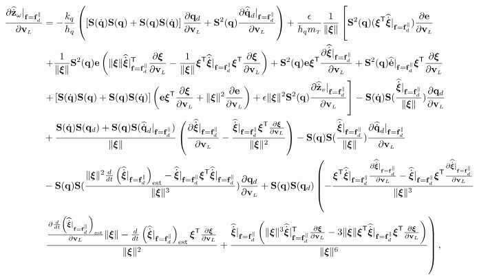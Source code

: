 \documentclass[journal,onecolumn]{IEEEtran}
\begin{document}
    \begin{align}
        \frac{\partial\zwdothat|_{\f=\fd^{\|}}}{\partial\vL}&=-\frac{k_q}{h_q}\left(\LSB\Skew{\dirdot}\Skew{\dir}+\Skew{\dir}\Skew{\dirdot}\RSB\frac{\partial\dird}{\partial\vL}
        +\Skew[2]{\dir}\frac{\partial\qddothat|_{\f=\fd^{\|}}}{\partial\vL}\right)+\frac{\epsilon}{h_{q}\mT}\frac{1}{\|\Xiq\|}\left[\vphantom{\frac{\partial\zvdothat|_{\f=\fd^{\|}}}{\partial\vL}}\Skew[2]{\dir}(\Xiq[T]\widehat{\dot{\Xiq}}|_{\f=\fd^{\|}})\frac{\partial{\bf e}}{\partial\vL}\right. \nonumber\\
        &\left.+\frac{1}{\|\Xiq\|}\Skew[2]{\dir}{\bf e}\LP\|\Xiq\|\widehat{\dot{\Xiq}}|_{\f=\fd^{\|}}\trs\frac{\partial\Xiq}{\partial\vL}-\frac{1}{\|\Xiq\|}\Xiq[T]\widehat{\dot{\Xiq}}|_{\f=\fd^{\|}}\Xiq[T]\frac{\partial\Xiq}{\partial\vL}\RP
        + \Skew[2]{\dir}{\bf e}\Xiq[T]\frac{\partial\widehat{\dot{\Xiq}}|_{\f=\fd^{\|}}}{\partial\vL}+\Skew[2]{\dir}\widehat{\dot{\bf e}}|_{\f=\fd^{\|}}\Xiq[T]\frac{\partial\Xiq}{\partial\vL}\right.\nonumber\\
        &
        \left.+\LSB\Skew{\dirdot}\Skew{\dir}+\Skew{\dir}\Skew{\dirdot}\RSB\LP{\bf e}\Xiq[T]\frac{\partial\Xiq}{\partial\vL} + \|\Xiq\|^2\frac{\partial{\bf e}}{\partial\vL}\RP +\epsilon\|\Xiq\|^2\Skew[2]{\dir}\frac{\partial\zvdothat|_{\f=\fd^{\|}}}{\partial\vL}\right]-\Skew{\dirdot}\Skew{\frac{\widehat{\dot{\Xiq}}|_{\f=\fd^{\|}}}{\|\Xiq\|}}\frac{\partial\dird}{\partial\vL} \nonumber\\
        &
        +\frac{\Skew{\dirdot}\Skew{\dird}+\Skew{\dir}\Skew{\qddothat|_{\f=\f_d^{\|}}}}{\|\Xiq\|}\LP\frac{\partial\widehat{\dot{\Xiq}}|_{\f=\fd^{\|}}}{\partial\vL}-\frac{\widehat{\dot{\Xiq}}|_{\f=\fd^{\|}}\Xiq[T]\frac{\partial\Xiq}{\partial\vL}}{\|\Xiq\|^2}\RP -\Skew{\dir}\Skew{\frac{\widehat{\dot{\Xiq}}|_{\f=\fd^{\|}}}{\|\Xiq\|}} \frac{\partial\qddothat|_{\f=\fd^{\|}}}{\partial\vL}\nonumber\\
        &
        -\Skew{\dir}\Skew{\frac{\|\Xiq\|^2\frac{d}{dt}\LP\widehat{\dot{\Xiq}}|_{\f=\fd^{\|}}\RP_{\text{est}}-\widehat{\dot{\Xiq}}|_{\f=\fd^{\|}}\Xiq[T]\widehat{\dot{\Xiq}}|_{\f=\fd^{\|}}}{\|\Xiq\|^3}}\frac{\partial\dird}{\partial\vL} +\Skew{\dir}\Skew{\dird}\left(-\frac{\Xiq[T]\widehat{\dot{\Xiq}}|_{\f=\fd^{\|}}\frac{\partial\widehat{\dot{\Xiq}}|_{\f=\fd^{\|}}}{\partial\vL}-
        \widehat{\dot{\Xiq}}|_{\f=\fd^{\|}}\Xiq[T]\frac{\partial\widehat{\dot{\Xiq}}|_{\f=\fd^{\|}}}{\partial\vL}}{\|\Xiq\|^3}\right.\nonumber\\
        &
        \left.\frac{\frac{\partial\frac{d}{dt}\LP\widehat{\dot{\Xiq}}|_{\f=\fd^{\|}}\RP_{\text{est}}}{\partial\vL}\|\Xiq\|-\frac{d}{dt}\LP\widehat{\dot{\Xiq}}|_{\f=\fd^{\|}}\RP_{\text{est}}\Xiq[T]\frac{\partial\Xiq}{\partial\vL}}{\|\Xiq\|^2}
        +\frac{\widehat{\dot{\Xiq}}|_{\f=\fd^{\|}}\LP\|\Xiq\|^3\widehat{\dot{\Xiq}}|_{\f=\fd^{\|}}\trs\frac{\partial\Xiq}{\partial\vL}-3\|\Xiq\|\Xiq[T]\widehat{\dot{\Xiq}}|_{\f=\fd^{\|}}\Xiq[T]\frac{\partial\Xiq}{\partial\vL}\RP}{\|\Xiq\|^6}\right),
    \end{align}
\end{document}

